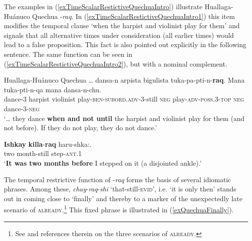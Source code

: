  The examples in  (\ref{exTimeScalarRestictiveQuechuaIntro}) illustrate Huallaga-Huánuco Quechua \mbox{-\textit{raq}}. In (\ref{exTimeScalarRestictiveQuechuaIntro1}) this item modifies the temporal clause \lq when the harpist and violinist play for them' and signals that all alternative times under consideration (all earlier times) would lead to a false proposition. This fact is also pointed out explicitly in the following sentence. The same function can be seen in (\ref{exTimeScalarRestictiveQuechuaIntro2}), but with a nominal complement.

\begin{exe}
	\ex\label{exTimeScalarRestictiveQuechuaIntro}
	\begin{xlist}
		\exi{}Huallaga-Huánuco Quechua
		\ex \label{exTimeScalarRestictiveQuechuaIntro1}
		\gll 	… dansa-n arpista bigulista tuka-pa-pti-n-\textbf{raq}. Mana tuka-pti-n-qa mana dansa-n-chu.\\
	{} dance-3 harpist violinist play-\textsc{ben}-\textsc{subord}.\textsc{adv}-3-still \textsc{neg} play-\textsc{adv}-\textsc{poss}.3-\textsc{top} \textsc{neg} dance-3-\textsc{neg}\\
	\glt \lq … they dance \textbf{when and not until} the harpist and violinist play for them (and not before). If they do not play, they do not dance.'

		\ex \label{exTimeScalarRestictiveQuechuaIntro2}
		\gll \textbf{Ishkay} \textbf{killa}-\textbf{raq} haru-shka:.\\
		two month-still step-\textsc{ant}.1\\
		\glt \lq \textbf{It was two months before} I stepped on it (a disjointed ankle).'
		\\\parencite[387]{Weber1989}
	\end{xlist}
\end{exe}

The temporal restrictive function of \mbox{-\textit{raq}} forms the basis of several idiomatic phrases. Among these, \textit{chay}-\textit{raq}-\textit{shi} \lq that-still-\textsc{evid}\rq{},  i.e. \lq{}it is only then\rq{ }stands out in coming close to \lq finally\rq{} and thereby to a marker of the unexpectedly late scenario of \textsc{already}.\footnote{See \textcite{Kramer2017} and references therein on the three scenarios of \textsc{already}.} This fixed phrase is illustrated in (\ref{exQuechuaFinally}).

